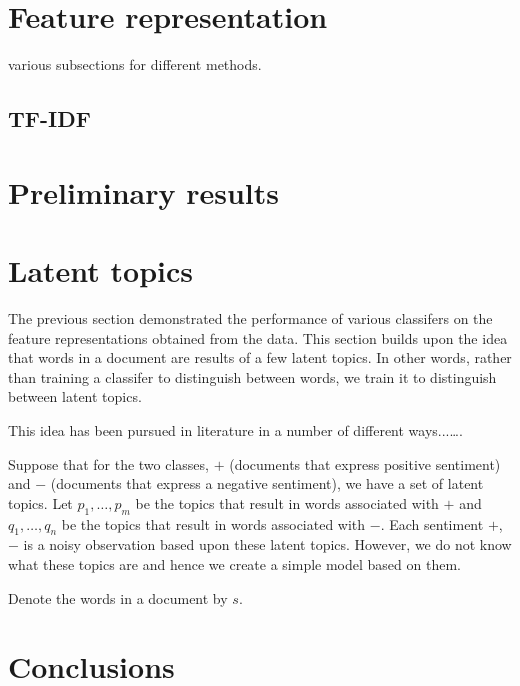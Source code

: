 \documentclass[10pt, letterpaper, conference, final, twocolumn]{ieeeconf}
\begin{document}
\section{Feature representation}
\label{sec:features}

various subsections for different methods.
\subsection{TF-IDF}
\label{ssec:tfidf}

\section{Preliminary results}
\label{sec:prelim}

\section{Latent topics}
\label{sec:latent}

The previous section demonstrated the performance of various classifers on the feature representations obtained from the data. This section builds upon the idea that words in a document are results of a few latent topics. In other words, rather than training a classifer to distinguish between words, we train it to distinguish between latent topics.

This idea has been pursued in literature in a number of different ways...\ldots.

Suppose that for the two classes, $+$ (documents that express positive sentiment) and $-$ (documents that express a negative sentiment), we have a set of latent topics. Let $p_1, \ldots, p_m$ be the topics that result in words associated with $+$ and $q_1, \ldots, q_n$ be the topics that result in words associated with $-$. Each sentiment $+$, $-$ is a noisy observation based upon these latent topics. However, we do not know what these topics are and hence we create a simple model based on them.

Denote the words in a document by $s$. 

\section{Conclusions}
\label{sec:conclusions}



\end{document}
